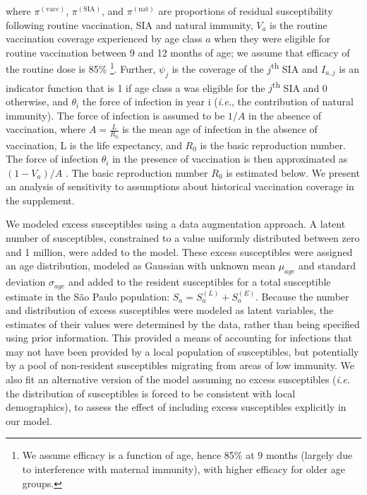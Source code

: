 where $\pi^{(\text{vacc})}$, $\pi^{(\text{SIA})}$, and $\pi^{(\text{nat})}$ are proportions of residual susceptibility following routine vaccination, SIA and natural immunity, \(V_a\) is the routine vaccination coverage experienced by age class \(a\) when they were eligible for routine vaccination between 9 and 12 months of age; we assume that efficacy of the routine dose is 85\% \cite{Uzicanin_2011}\footnote{We assume efficacy is a function of age, hence 85\% at 9 months (largely due to interference with maternal immunity), with higher efficacy for older age groups.}. Further, \(\psi_{j}\) is the coverage of the \(j\)\textsuperscript{th} SIA and \(I_{a,j}\) is an indicator function that is 1 if age class a was eligible for the \(j\)\textsuperscript{th} SIA and 0 otherwise, and \(\theta_i\) the force of infection in year i (\emph{i.e.}, the contribution of natural immunity).  The force of infection is assumed to be \(1/A\) in the absence of vaccination, where \(A=\frac{L}{R_0}\) \cite{Anderson_1981} is the mean age of infection in the absence of vaccination, L is the life expectancy, and \(R_0\) is the basic reproduction number. The force of infection \(\theta_i\) in the presence of vaccination is then approximated as \((1-V_a)/A\) \cite{Anderson_1981}.  The basic reproduction number \(R_0\) is estimated below.  We present an analysis of sensitivity to assumptions about historical vaccination coverage in the supplement.

We modeled excess susceptibles using a data augmentation approach. A latent number of susceptibles, constrained to a value uniformly distributed between zero and 1 million, were added to the model. These excess susceptibles were assigned an age distribution, modeled as Gaussian with unknown mean \(\mu_{age}\) and standard deviation \(\sigma_{age}\) and added to the resident susceptibles for a total susceptible estimate in the S\~{a}o Paulo population: \(S_a = S_a^{(L)} + S_a^{(E)}\). Because the number and distribution of excess susceptibles were modeled as latent variables, the estimates of their values were determined by the data, rather than being specified using prior information. This provided a means of accounting for infections that may not have been provided by a local population of susceptibles, but potentially by a pool of non-resident susceptibles migrating from areas of low immunity. We also fit an alternative version of the model assuming no excess susceptibles (\emph{i.e.} the distribution of susceptibles is forced to be consistent with local demographics), to assess the effect of including excess susceptibles explicitly in our model.

